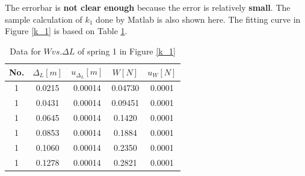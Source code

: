     The errorbar is \textbf{not clear enough} because the error is relatively \textbf{small}. The sample calculation of $k_1$ done by Matlab is also shown here. The fitting curve in Figure \ref{k_1} is based on Table \ref{k1data}.
    \begin{table}
        \centering
        \begin{tabular}{|c|c|c|c|c|}
            \hline
            No. & $\Delta_L[m]$ & $u_{\Delta_L}[m]$ & $W[N]$ & $u_{W}[N]$\\ \hline
            1 & 0.0215 & 0.00014 & 0.04730 & 0.0001\\ \hline
            1 & 0.0431 & 0.00014& 0.09451 & 0.0001\\ \hline
            1 & 0.0645 & 0.00014& 0.1420 & 0.0001\\ \hline
            1 & 0.0853 & 0.00014& 0.1884 & 0.0001\\ \hline
            1 & 0.1060 & 0.00014& 0.2350 & 0.0001\\ \hline
            1 & 0.1278 & 0.00014& 0.2821 & 0.0001\\ \hline
        \end{tabular}
        \caption{Data for $W vs. \Delta L$ of spring 1 in Figure \ref{k_1}}\label{k1data}
    \end{table}
